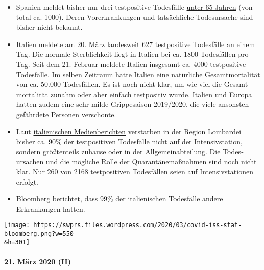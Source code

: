 \begin{itemize}
\tightlist
\item
  Spanien meldet bisher nur drei testpositive Todesfälle
  \href{https://www.20minutos.es/noticia/4193883/0/media-edad-coronavirus-espana/}{unter
  65 Jahren} (von total ca. 1000). Deren Vorerkrankungen und
  tatsächliche Todesursache sind bisher nicht bekannt.
\item
  Italien
  \href{https://www.msn.com/en-au/news/coronavirus/italy-coronavirus-deaths-surge-by-627-in-a-day-lifting-total-death-toll-to-4032/ar-BB11tDnS}{meldete}
  am 20. März landesweit 627 testpositive Todesfälle an einem Tag. Die
  normale Sterblichkeit liegt in Italien bei ca. 1800 Todesfällen pro
  Tag. Seit dem 21. Februar meldete Italien insgesamt ca. 4000
  testpositive Todesfälle. Im selben Zeitraum hatte Italien eine
  natürliche Gesamtmortalität von ca. 50.000 Todesfällen. Es ist noch
  nicht klar, um wie viel die Gesamt­mortalität zunahm oder aber einfach
  testpositiv wurde. Italien und Europa hatten zudem eine sehr milde
  Grippesaison 2019/2020, die viele ansonsten gefährdete Personen
  verschonte.
\item
  Laut
  \href{https://www.tgcom24.mediaset.it/cronaca/coronavirus-in-lombardia-9-morti-su-10-mai-giunti-in-terapia-intensiva_16362350-202002a.shtml}{italienischen
  Medienberichten} verstarben in der Region Lombardei bisher ca. 90\%
  der testpositiven Todesfälle nicht auf der Intensivstation, sondern
  größtenteils zuhause oder in der Allgemeinabteilung. Die
  Todes­ursachen und die mögliche Rolle der Quarantäne­maßnahmen sind
  noch nicht klar. Nur 260 von 2168 testpositiven Todesfällen seien auf
  Intensivstationen erfolgt.
\item
  Bloomberg
  \href{https://www.bloomberg.com/news/articles/2020-03-18/99-of-those-who-died-from-virus-had-other-illness-italy-says}{berichtet},
  dass 99\% der italienischen Todesfälle andere Erkrankungen hatten.
\end{itemize}

\texttt{[image: https://swprs.files.wordpress.com/2020/03/covid-iss-stat-bloomberg.png?w=550\\\&h=301]}

\hypertarget{21-muxe4rz-2020-ii}{%
\paragraph{21. März 2020 (II)}\label{21-muxe4rz-2020-ii}}


